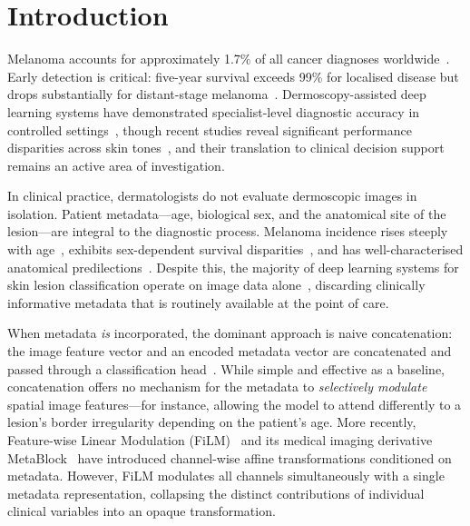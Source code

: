 \documentclass[12pt, a4paper]{article}
\begin{document}
\section{Introduction}
\label{sec:intro}

Melanoma accounts for approximately 1.7\% of all cancer diagnoses worldwide~\citep{sung2021global}. Early detection is critical: five-year survival exceeds 99\% for localised disease but drops substantially for distant-stage melanoma~\citep{siegel2023cancer}. Dermoscopy-assisted deep learning systems have demonstrated specialist-level diagnostic accuracy in controlled settings~\citep{esteva2017dermatologist, haenssle2018man}, though recent studies reveal significant performance disparities across skin tones~\citep{groh2024deep}, and their translation to clinical decision support remains an active area of investigation.

In clinical practice, dermatologists do not evaluate dermoscopic images in isolation. Patient metadata---age, biological sex, and the anatomical site of the lesion---are integral to the diagnostic process. Melanoma incidence rises steeply with age~\citep{whiteman2016growing}, exhibits sex-dependent survival disparities~\citep{joosse2011gender}, and has well-characterised anatomical predilections~\citep{elwood1998distribution}. Despite this, the majority of deep learning systems for skin lesion classification operate on image data alone~\citep{brinker2019deep, tschandl2019comparison}, discarding clinically informative metadata that is routinely available at the point of care.

When metadata \emph{is} incorporated, the dominant approach is naive concatenation: the image feature vector and an encoded metadata vector are concatenated and passed through a classification head~\citep{pacheco2020impact, yap2018multimodal}. While simple and effective as a baseline, concatenation offers no mechanism for the metadata to \emph{selectively modulate} spatial image features---for instance, allowing the model to attend differently to a lesion's border irregularity depending on the patient's age. More recently, Feature-wise Linear Modulation (FiLM)~\citep{perez2018film} and its medical imaging derivative MetaBlock~\citep{pacheco2021metablock} have introduced channel-wise affine transformations conditioned on metadata. However, FiLM modulates all channels simultaneously with a single metadata representation, collapsing the distinct contributions of individual clinical variables into an opaque transformation.
\end{document}
